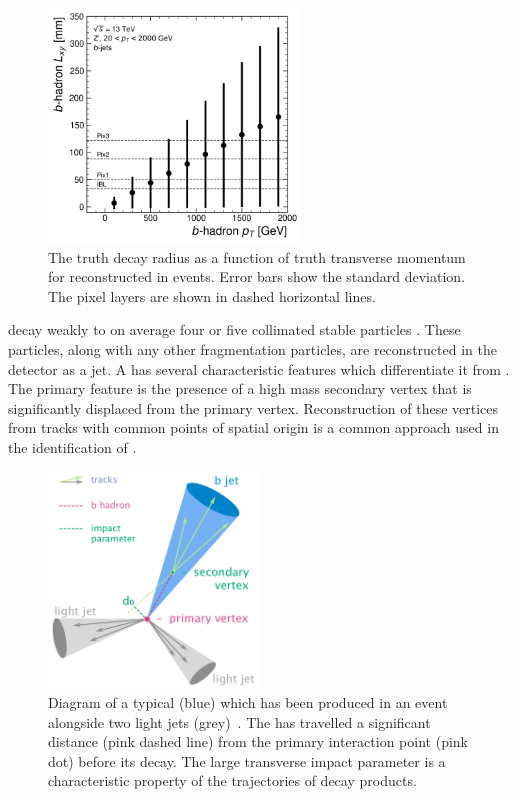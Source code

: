 \begin{figure}[!htbp]
  \centering
  \includegraphics[width=0.6\textwidth]{chapters/3.tracking/figs/b_pt_lxy.pdf}
  \caption{
    The truth \bhadron decay radius \Lxy as a function of truth transverse momentum \pt for reconstructed \bjets in \Zprime events.
    Error bars show the standard deviation.
    The pixel layers are shown in dashed horizontal lines.
  }
  \label{fig:b_lxy_vs_pt}
\end{figure}

\bhadrons decay weakly to on average four or five collimated stable particles \cite{ATL-PHYS-PUB-2014-008}.
These particles, along with any other fragmentation particles, are reconstructed in the detector as a jet.
A \bjet has several characteristic features which differentiate it from \ljets.
The primary feature is the presence of a high mass secondary vertex that is significantly displaced from the primary vertex.
Reconstruction of these vertices from tracks with common points of spatial origin is a common approach used in the identification of \bjets.


\begin{figure}[!tbp]
  \centering
  \includegraphics[width=0.5\textwidth]{chapters/3.tracking/figs/b-jet-diagram.png}
  \caption{
    Diagram of a typical \bjet (blue) which has been produced in an event alongside two light jets (grey)~\cite{bjetdiagram}.
    The \bhadron has travelled a significant distance (pink dashed line) from the primary interaction point (pink dot) before its decay.
    The large transverse impact parameter \dzero is a characteristic property of the trajectories of \bhadron decay products.}
  \label{fig:bjet_diagram}
\end{figure}


